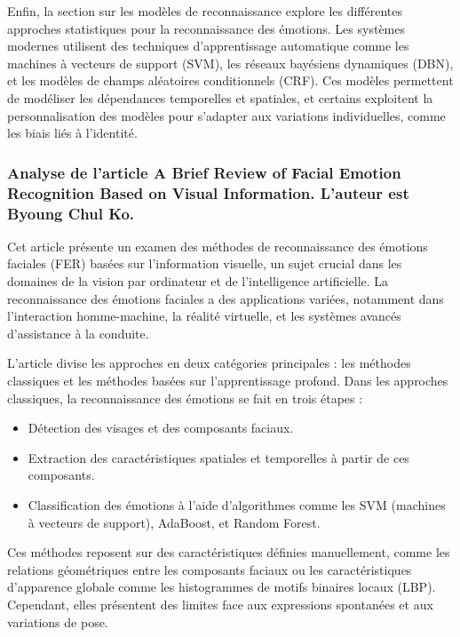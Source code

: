 \documentclass{rapport}
\begin{document}
Enfin, la section sur les modèles de reconnaissance explore les différentes 
approches statistiques pour la reconnaissance des émotions. Les systèmes modernes 
utilisent des techniques d'apprentissage automatique comme les machines à vecteurs 
de support (SVM), les réseaux bayésiens dynamiques (DBN), et les modèles de champs 
aléatoires conditionnels (CRF). Ces modèles permettent de modéliser les dépendances 
temporelles et spatiales, et certains exploitent la personnalisation des modèles 
pour s’adapter aux variations individuelles, comme les biais liés à l'identité.

\subsubsection{Analyse de l'article \cite{koBriefReviewFacial2018} A Brief Review of Facial Emotion Recognition Based on Visual Information. L'auteur est Byoung Chul Ko.}

Cet article présente un examen des méthodes de reconnaissance des émotions faciales 
(FER) basées sur l'information visuelle, un sujet crucial dans les domaines de la 
vision par ordinateur et de l'intelligence artificielle. La reconnaissance des 
émotions faciales a des applications variées, notamment dans l'interaction 
homme-machine, la réalité virtuelle, et les systèmes avancés d'assistance à la conduite.

L'article divise les approches en deux catégories principales : les méthodes classiques 
et les méthodes basées sur l'apprentissage profond. Dans les approches classiques, 
la reconnaissance des émotions se fait en trois étapes :
\begin{itemize}
    \item Détection des visages et des composants faciaux.
    \item Extraction des caractéristiques spatiales et temporelles à partir de ces composants.
    \item Classification des émotions à l'aide d'algorithmes comme les SVM (machines à vecteurs de support), AdaBoost, et Random Forest.
\end{itemize}
Ces méthodes reposent sur des caractéristiques définies manuellement, comme les 
relations géométriques entre les composants faciaux ou les caractéristiques 
d'apparence globale comme les histogrammes de motifs binaires locaux (LBP). 
Cependant, elles présentent des limites face aux expressions spontanées et aux variations de pose.
\end{document}
